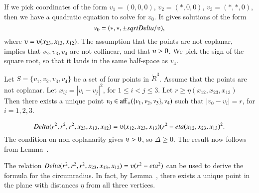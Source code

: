 \begin{tarskidata}
\begin{tarski}
\begin{proved} If we pick coordinates of the form $v_1=(0,0,0)$,
$v_2=(*,0,0)$, $v_3=(*,*,0)$, then we have a quadratic equation to
solve for $v_0$.  It gives solutions of the form
   $$
   v_0 = (*,*,\pm\sqrt{\Delta/\ups}),
   $$
where $\ups = \ups(x_{23},x_{13},x_{12})$.  The assumption that the points
are not coplanar, implies that $v_2,v_3,v_4$ are not collinear, and that
$\ups>0$.  We pick the sign of the square root, so that it lands in the
same half-space as $v_4$.  
\swallowed\end{proved}
\end{tarski}





\begin{tarski}

\begin{lemma}
Let $S=\{v_1,v_2,v_3,v_4\}$ be a set of four points
in $\ring{R}^3$.  Assume that the points are not coplanar.
Let $x_{ij} = |v_i-v_j|^2$, for $1\le i < j\le 3$.
Let $r\ge \eta(x_{12},x_{23},x_{13})$ 
Then there exists a unique point $v_0\in{\operatorname{aff}}_+(\{v_1,v_2,v_3\},v_4)$
such that
   $|v_0-v_i| = r$, for $i=1,2,3$.
\end{lemma}

\begin{proved}
$$\Delta(r^2,r^2,r^2,x_{23},x_{13},x_{12})=
   \ups(x_{12},x_{23},x_{13}) (r^2-\eta(x_{12},x_{23},x_{13})^2.$$
The condition on non coplanarity gives $\ups>0$, so
$\Delta\ge0$.  The result now follows from Lemma~. 
\swallowed\end{proved}
\end{tarski}



\begin{remark} 
The relation 
$\Delta(r^2,r^2,r^2,x_{23},x_{13},x_{12})=\ups (r^2-\eta^2)$
can be used to derive the formula for the circumradius. In fact,
by Lemma~, there exists a unique point
in the plane with distances $\eta$ from all three vertices.
\end{remark}



\begin{tarski}


\end{tarski}
\end{tarskidata}
